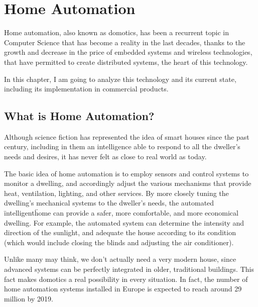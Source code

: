 \chapter{Home Automation}

Home automation, also known as domotics, has been a recurrent topic in Computer Science that
has become a reality in the last decades, thanks to the growth and decrease in the price of embedded
systems and wireless technologies, that have permitted to create distributed systems, the heart of this technology.

\bigskip
In this chapter, I am going to analyze this technology and its current state, including its implementation in commercial
products.

\section{What is Home Automation?}

Although science fiction has represented the idea of smart houses since the past century, including in them
an intelligence able to respond to all the dweller’s needs and desires, it has never felt as close to real world as today.

\bigskip
The basic idea of home automation is to employ sensors and control systems to monitor a dwelling, and accordingly 
adjust the various mechanisms that provide heat, ventilation, lighting, and other services. By more closely tuning the 
dwelling’s mechanical systems to the dweller’s needs, the automated \"intelligent\" home can provide a safer, more 
comfortable, and more economical dwelling.\cite{smarthouse98} For example, the automated system can determine 
the intensity and direction of the sunlight, and adequate the house according to its condition (which would include
closing the blinds and adjusting the air conditioner).

\bigskip
Unlike many may think, we don't actually need a very modern house, since advanced systems can be perfectly integrated 
in older, traditional buildings. This fact makes domotics a real possibility in every situation. In fact, the number of home 
automation systems installed in Europe is expected to reach around 29 million by 2019.\cite{statistaInstalled}

